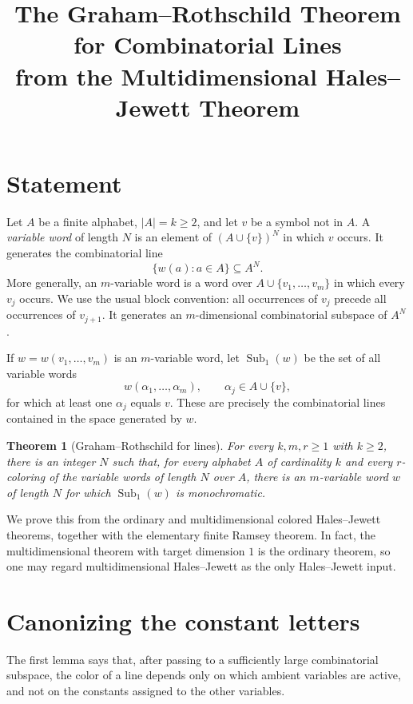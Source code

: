 \documentclass[11pt]{article}
\title{The Graham--Rothschild Theorem for Combinatorial Lines\\
from the Multidimensional Hales--Jewett Theorem}
\author{}
\date{}
\newtheorem{theorem}{Theorem}
\theoremstyle{remark}
\newcommand{\Sub}{\operatorname{Sub}}
\begin{document}
\maketitle

\section{Statement}

Let $A$ be a finite alphabet, $|A|=k\ge 2$, and let $v$ be a symbol not in
$A$. A \emph{variable word} of length $N$ is an element of
$(A\cup\{v\})^N$ in which $v$ occurs. It generates the combinatorial line
\[
  \{w(a):a\in A\}\subseteq A^N.
\]
More generally, an $m$-variable word is a word over
$A\cup\{v_1,\dots,v_m\}$ in which every $v_j$ occurs. We use the usual
block convention: all occurrences of $v_j$ precede all occurrences of
$v_{j+1}$. It generates an $m$-dimensional combinatorial subspace of $A^N$.

If $w=w(v_1,\dots,v_m)$ is an $m$-variable word, let $\Sub_1(w)$ be the set
of all variable words
\[
  w(\alpha_1,\dots,\alpha_m),
  \qquad
  \alpha_j\in A\cup\{v\},
\]
for which at least one $\alpha_j$ equals $v$. These are precisely the
combinatorial lines contained in the space generated by $w$.

\begin{theorem}[Graham--Rothschild for lines]\label{thm:GR-lines}
For every $k,m,r\ge 1$ with $k\ge 2$, there is an integer $N$ such that,
for every alphabet $A$ of cardinality $k$ and every $r$-coloring of the
variable words of length $N$ over $A$, there is an $m$-variable word $w$
of length $N$ for which $\Sub_1(w)$ is monochromatic.
\end{theorem}

We prove this from the ordinary and multidimensional colored
Hales--Jewett theorems, together with the elementary finite Ramsey theorem.
In fact, the multidimensional theorem with target dimension $1$ is the
ordinary theorem, so one may regard multidimensional Hales--Jewett as the
only Hales--Jewett input.

\section{Canonizing the constant letters}

The first lemma says that, after passing to a sufficiently large
combinatorial subspace, the color of a line depends only on which ambient
variables are active, and not on the constants assigned to the other
variables.
\end{document}
